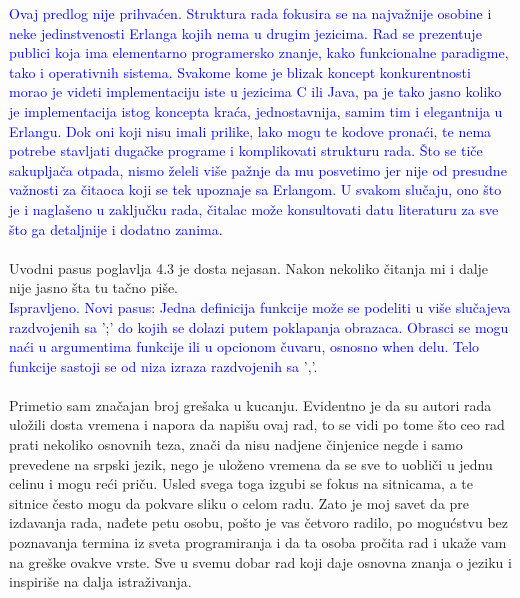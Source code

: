 \documentclass[a4paper]{report}
\newcommand{\odgovor}[1]{\textcolor{blue}{#1}}
\begin{document}
\odgovor{Ovaj predlog nije prihvaćen. Struktura rada fokusira se na 
najvažnije osobine i neke jedinstvenosti Erlanga kojih nema u drugim jezicima. Rad se prezentuje publici koja ima
elementarno programersko znanje, kako funkcionalne paradigme, tako i
operativnih sistema. Svakome kome je blizak koncept konkurentnosti morao je
videti implementaciju iste u jezicima C ili Java, pa je tako jasno koliko je implementacija istog koncepta kraća, jednostavnija, samim tim i elegantnija u Erlangu. Dok oni koji nisu imali prilike, lako mogu te kodove pronaći, te nema potrebe stavljati dugačke programe i komplikovati
strukturu rada.
Što se tiče sakupljača otpada, nismo želeli više pažnje da mu
posvetimo jer nije od presudne važnosti za čitaoca koji se tek upoznaje
sa Erlangom. U svakom slučaju, ono što je i naglašeno u zaključku rada, čitalac može konsultovati datu literaturu za sve što ga detaljnije i dodatno zanima.}

\paragraph{}
Uvodni pasus poglavlja 4.3 je dosta nejasan. Nakon nekoliko čitanja mi i dalje nije jasno šta tu tačno piše.\\

\odgovor{Ispravljeno. Novi pasus: Jedna definicija funkcije može se podeliti u više slučajeva
razdvojenih sa ';' do kojih se dolazi putem poklapanja obrazaca.
Obrasci se mogu naći u argumentima funkcije ili u opcionom čuvaru,
osnosno when delu. Telo funkcije sastoji se od niza izraza razdvojenih sa ','.}

\paragraph{} 
Primetio sam značajan broj grešaka u kucanju. Evidentno je da su autori rada uložili dosta vremena i napora da napišu ovaj rad, to se vidi po tome što ceo rad prati nekoliko osnovnih teza, znači da nisu nadjene činjenice negde i samo prevedene na srpski jezik, nego je uloženo vremena da se sve to uobliči u jednu celinu i mogu reći priču. Usled svega toga izgubi se fokus na sitnicama, a te sitnice često mogu da pokvare sliku o celom radu. Zato je moj savet da pre izdavanja rada, nađete petu osobu, pošto je vas četvoro radilo, po mogućstvu bez poznavanja termina iz sveta programiranja i da ta osoba pročita rad i ukaže vam na greške ovakve vrste.
Sve u svemu dobar rad koji daje osnovna znanja o jeziku i inspiriše na dalja istraživanja.\\
\end{document}
